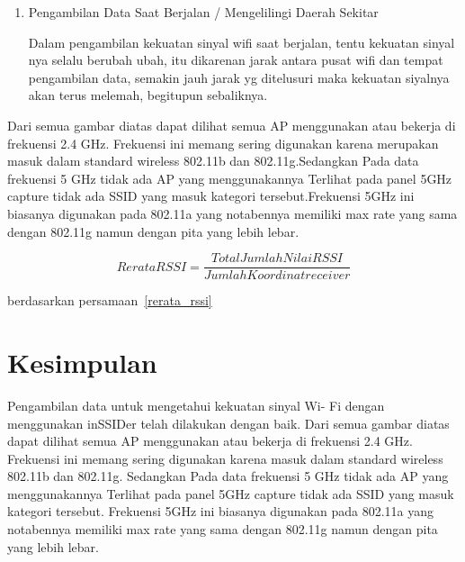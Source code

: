 \documentclass[conference]{IEEEtran}
\begin{document}
\begin{enumerate}
    \item Pengambilan Data Saat Berjalan / Mengelilingi Daerah
    Sekitar

\vspace{0.2cm}

Dalam pengambilan kekuatan sinyal wifi saat berjalan,
tentu kekuatan sinyal nya selalu berubah ubah, itu
dikarenan jarak antara pusat wifi dan tempat pengambilan
data, semakin jauh jarak yg ditelusuri maka kekuatan
siyalnya akan terus melemah, begitupun sebaliknya.
\end{enumerate}

\vspace{0.2cm}
Dari semua gambar diatas dapat dilihat semua AP menggunakan
atau bekerja di frekuensi 2.4 GHz. Frekuensi
ini memang sering digunakan karena merupakan masuk
dalam standard wireless 802.11b dan 802.11g.Sedangkan
Pada data frekuensi 5 GHz tidak ada AP yang
menggunakannya Terlihat pada panel 5GHz capture
tidak ada SSID yang masuk kategori tersebut.Frekuensi
5GHz ini biasanya digunakan pada 802.11a yang notabennya
memiliki max rate yang sama dengan 802.11g
namun dengan pita yang lebih lebar.


\begin{equation}
    Rerata RSSI = \frac{Total Jumlah Nilai RSSI}{Jumlah Koordinat receiver}
    \label{rerata_rssi}
\end{equation}

berdasarkan persamaan~\ref{rerata_rssi}

\section{Kesimpulan}
Pengambilan data untuk mengetahui kekuatan sinyal Wi-
Fi dengan menggunakan inSSIDer telah dilakukan dengan
baik. Dari semua gambar diatas dapat dilihat semua AP
menggunakan atau bekerja di frekuensi 2.4 GHz. Frekuensi ini
memang sering digunakan karena masuk dalam standard wireless
802.11b dan 802.11g. Sedangkan Pada data frekuensi 5 GHz tidak ada AP yang menggunakannya Terlihat pada panel
5GHz capture tidak ada SSID yang masuk kategori tersebut.
Frekuensi 5GHz ini biasanya digunakan pada 802.11a yang
notabennya memiliki max rate yang sama dengan 802.11g
namun dengan pita yang lebih lebar.
\end{document}

